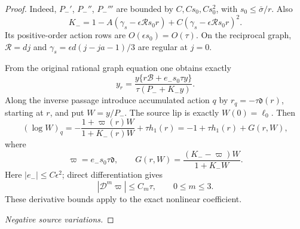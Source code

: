 \begin{proof}
Indeed, $P_-'$, $P_-''$, $P_-'''$ are bounded by
$C,Cs_0,Cs_0^2$, with $s_0\le\bar\sigma/r$. Also
\begin{equation}
 K_-=1-A(\gamma_s-\epsilon\mathcal R s_0r)
           +C(\gamma_s-\epsilon\mathcal R s_0r)^2.
 \label{deg:source-growing-negative-K}
\end{equation}
Its positive-order action rows are $O(\epsilon s_0)=O(\tau)$.
On the reciprocal graph, $\mathcal R=dj$ and
$\gamma_s=\epsilon d(j-ja-1)/3$ are regular at $j=0$.

From the original rational graph equation one obtains exactly
\begin{equation}
 y_r=\frac{y\{r\mathscr B+e_-s_0\tau y\}}
                 {\tau(P_-+K_-y)}.
 \label{deg:source-growing-negative-scalar-equation}
\end{equation}
Along the inverse passage introduce accumulated action \(q\)
by \(r_q=-\tau\mathfrak d(r)\), starting at \(r\), and put
\(W=y/P_-\).  The source lip is exactly \(W(0)=\ell_0\).
Then
\begin{equation}
 (\log W)_q=
 -\frac{1+\varpi(r)W}{1+K_-(r)W}+\tau h_1(r)
 =-1+\tau h_1(r)+G(r,W),
 \label{deg:source-growing-stable-ratio-equation}
\end{equation}
where
\begin{equation}
 \varpi=e_-s_0\tau\mathfrak d,\qquad
 G(r,W)=\frac{(K_--\varpi)W}{1+K_-W}.
 \label{deg:source-growing-stable-ratio-nonlinearity}
\end{equation}
Here \(|e_-|\le C\epsilon^2\); direct differentiation gives
\begin{equation}
 |\mathcal D^m\varpi|\le C_m\tau,\qquad 0\le m\le3.
 \label{deg:source-growing-stable-coefficient-rows}
\end{equation}
These derivative bounds apply to the exact nonlinear coefficient.

\smallskip
\noindent\emph{Negative source variations.}\par\nopagebreak[4]


\end{proof}

